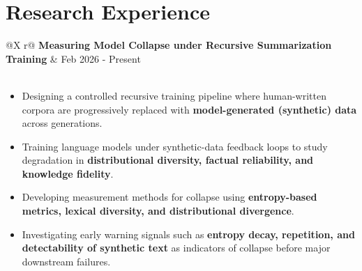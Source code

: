 \documentclass[a4paper,11pt]{article}
\begin{document}

\color{BlueViolet}
\section{Research Experience}
\color{black}

\begin{tabularx}{\linewidth}{@{}X r@{}}
\textbf{Measuring Model Collapse under Recursive Summarization Training} & Feb 2026 - Present \\
 \\
\end{tabularx}
\begin{itemize}[nosep, after=\strut, leftmargin=1.5em, itemsep=2pt]
    \item Designing a controlled recursive training pipeline where human-written corpora are progressively replaced with \textbf{model-generated (synthetic) data} across generations.
    \item Training language models under synthetic-data feedback loops to study degradation in \textbf{distributional diversity, factual reliability, and knowledge fidelity}.
    \item Developing measurement methods for collapse using \textbf{entropy-based metrics, lexical diversity, and distributional divergence}.
    \item Investigating early warning signals such as \textbf{entropy decay, repetition, and detectability of synthetic text} as indicators of collapse before major downstream failures.
\end{itemize}
\end{document}
